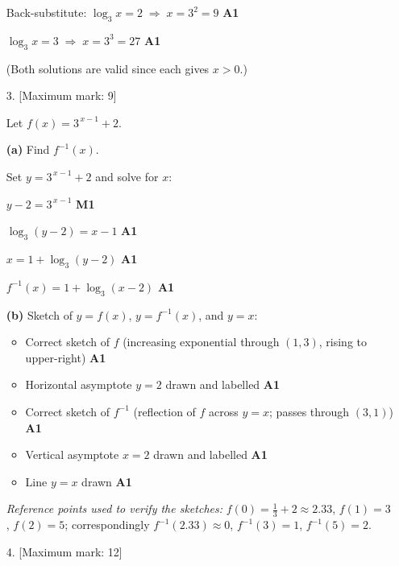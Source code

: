 \documentclass[12pt, twoside]{article}
\begin{document}
\begin{enumerate}[itemsep=0.3cm]
\medskip

Back-substitute:
\;\;$\log_3 x = 2 \;\Rightarrow\; x = 3^2 = 9$ \hfill \textbf{A1}

\;\;$\log_3 x = 3 \;\Rightarrow\; x = 3^3 = 27$ \hfill \textbf{A1}

\smallskip

(Both solutions are valid since each gives $x > 0$.)

\newpage

\item[3.] [Maximum mark: 9]

Let $f(x) = 3^{\,x-1} + 2$.

\textbf{(a)} Find $f^{-1}(x)$.

Set $y = 3^{\,x-1} + 2$ and solve for $x$:

$y - 2 = 3^{\,x-1}$ \hfill \textbf{M1}

$\log_3(y - 2) = x - 1$ \hfill \textbf{A1}

$x = 1 + \log_3(y - 2)$ \hfill \textbf{A1}

$f^{-1}(x) = 1 + \log_3(x - 2)$ \hfill \textbf{A1}

\medskip

\textbf{(b)} Sketch of $y = f(x)$, $y = f^{-1}(x)$, and $y = x$:

\begin{itemize}\setlength\itemsep{0pt}
  \item Correct sketch of $f$ (increasing exponential through $(1, 3)$,
  rising to upper-right) \hfill \textbf{A1}
  \item Horizontal asymptote $y = 2$ drawn and labelled \hfill \textbf{A1}
  \item Correct sketch of $f^{-1}$ (reflection of $f$ across $y = x$;
  passes through $(3, 1)$) \hfill \textbf{A1}
  \item Vertical asymptote $x = 2$ drawn and labelled \hfill \textbf{A1}
  \item Line $y = x$ drawn \hfill \textbf{A1}
\end{itemize}

\noindent\emph{Reference points used to verify the sketches:}
\;$f(0) = \tfrac{1}{3} + 2 \approx 2.33$, \;$f(1) = 3$, \;$f(2) = 5$;\;
correspondingly $f^{-1}(2.33) \approx 0$, \;$f^{-1}(3) = 1$,
\;$f^{-1}(5) = 2$.

\newpage

\item[4.] [Maximum mark: 12]


\end{enumerate}
\end{document}
